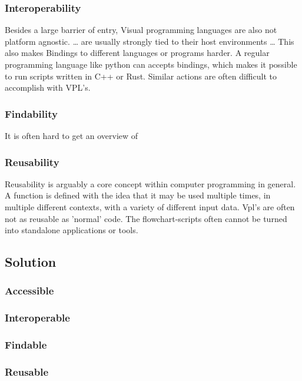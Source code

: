 \subsubsection*{Interoperability}
Besides a large barrier of entry, Visual programming languages are also not platform agnostic. 
\dots
are usually strongly tied to their host environments
\dots
This also makes Bindings to different languages or programs harder. A regular programming language like python can accepts bindings, which makes it possible to run scripts written in C++ or Rust. Similar actions are often difficult to accomplish with VPL's.

\subsubsection*{Findability}
It is often hard to get an overview of 


\subsubsection*{Reusability}
Reusability is arguably a core concept within computer programming in general. 
A function is defined with the idea that it may be used multiple times, in multiple different contexts, with a variety of different input data.
Vpl's are often not as reusable as 'normal' code. The flowchart-scripts often cannot be turned into standalone applications or tools.



\newpage
\subsection{Solution}


\subsubsection*{Accessible}


\subsubsection*{Interoperable}



\subsubsection*{Findable}


\subsubsection*{Reusable}



